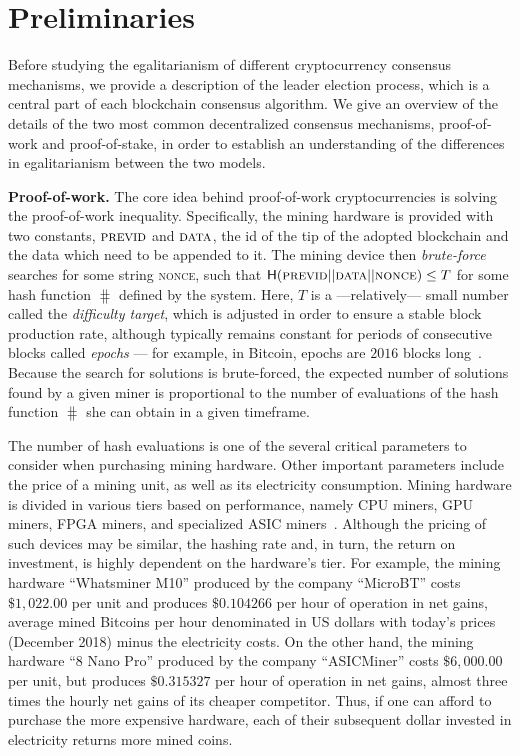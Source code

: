 \section{Preliminaries}\label{sec:preliminaries}

Before studying the egalitarianism of different cryptocurrency consensus mechanisms, we
provide a description of the leader election process, which is a central part
of each blockchain consensus algorithm. We give an
overview of the details of the two most common decentralized consensus mechanisms,
proof-of-work and proof-of-stake, in order to establish an understanding of the
differences in egalitarianism between the two models.

\noindent\textbf{Proof-of-work.}
The core idea behind proof-of-work cryptocurrencies is solving the
proof-of-work inequality.  Specifically, the mining hardware is provided with
two constants, $\textsc{previd}$ and $\textsc{data}$, \ie the id of the
tip of the adopted blockchain and the data which need to be appended to it.  The mining
device then \emph{brute-force} searches for some string \textsc{nonce}, such
that $\mathsf{H}(\textsc{previd} || \textsc{data} || \textsc{nonce}) \leq T$ for
some hash function $\hash$ defined by the system. Here, $T$ is a
---relatively--- small number called the \emph{difficulty target}, which is
adjusted in order to ensure a stable block production rate, although typically
remains constant for periods of consecutive blocks called \emph{epochs} --- for
example, in Bitcoin, epochs are $2016$ blocks long~\cite{SP:BMCNKF15}. Because the search for
solutions is brute-forced, the expected number of solutions found by a given
miner is proportional to the number of evaluations of the
hash function $\hash$ she can obtain in a given timeframe.

The number of hash evaluations is one of the several critical parameters to
consider when purchasing mining hardware. Other important parameters include
the price of a mining unit, as well as its electricity consumption.  Mining
hardware is divided in various tiers based on performance, namely CPU miners,
GPU miners, FPGA miners, and specialized ASIC miners~\cite{taylor2013bitcoin}.  Although the pricing of
such devices may be similar, the hashing rate and, in turn, the return on
investment, is highly dependent on the hardware's tier.  For example,
the mining hardware ``Whatsminer M10'' produced by the company ``MicroBT''
costs $\$1{,}022.00$ per unit and produces $\$0.104266$ per hour of operation in
net gains, \ie average mined Bitcoins per hour denominated in US dollars with today's
prices (December 2018) minus the electricity costs. On the other hand, the
mining hardware ``8 Nano Pro'' produced by the company ``ASICMiner'' costs
$\$6{,}000.00$ per unit, but produces $\$0.315327$ per hour of operation in net
gains, \ie almost three times the hourly net gains of its cheaper competitor.
Thus, if one can afford to purchase the more expensive hardware, each of their
subsequent dollar invested in electricity returns more mined coins.

